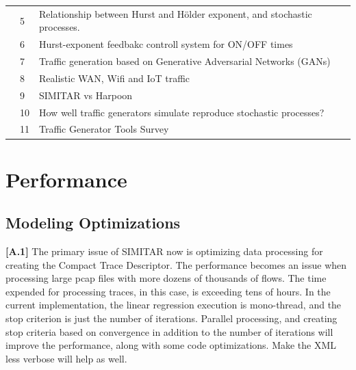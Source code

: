 \begin{table}[!ht]
\begin{tabular}{lll}
                                              & 5                          & Relationship between Hurst and Hölder exponent, and stochastic processes.           \\
                                              & \cellcolor[HTML]{EFEFEF}6  & \cellcolor[HTML]{EFEFEF}Hurst-exponent feedbakc controll system for ON/OFF times   \\
                                              & 7                          & Traffic generation based on  Generative Adversarial Networks (GANs)  \\
                                              & \cellcolor[HTML]{EFEFEF}8  & \cellcolor[HTML]{EFEFEF} Realistic WAN, Wifi and IoT traffic \\
                                              & 9                          & SIMITAR vs Harpoon \\
                                              & \cellcolor[HTML]{EFEFEF}10 & \cellcolor[HTML]{EFEFEF}  How well traffic generators simulate reproduce stochastic processes?\\ 
                                              & 11                          & Traffic Generator Tools Survey \\
                                              \hline
\end{tabular}
\end{table}



\section{Performance}


\subsection{Modeling Optimizations}

\textbf{[A.1]} The primary issue of SIMITAR now is optimizing data processing for creating the Compact Trace Descriptor. The performance becomes an issue when processing large pcap files with more dozens of thousands of flows. The time expended for processing traces, in this case, is exceeding tens of hours. In the current implementation, the linear regression execution is mono-thread, and the stop criterion is just the number of iterations. Parallel processing, and creating stop criteria based on convergence in addition to the number of iterations will improve the performance, along with some code optimizations. Make the XML less verbose will help as well.

